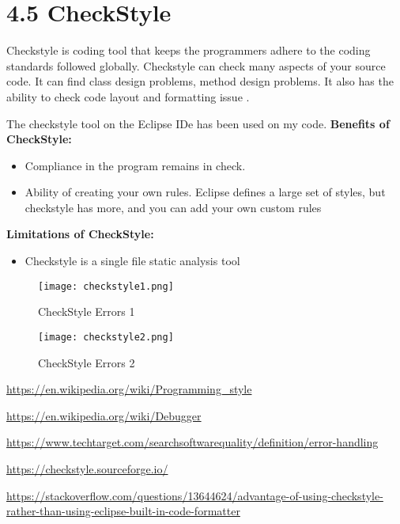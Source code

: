 \documentclass{report}
\begin{document}
\section*{4.5 CheckStyle}
Checkstyle is coding tool that keeps the programmers adhere to the coding standards followed globally. Checkstyle can check many aspects of your source code. It can find class design problems, method design problems. It also has the ability to check code layout and formatting issue \cite{check}.

The checkstyle tool on the Eclipse IDe has been used on my code.
\textbf{Benefits of CheckStyle:}
\begin{itemize}
    \item Compliance in the program remains in check.
    \item Ability of creating your own rules. Eclipse defines a large set of styles, but checkstyle has more, and you can add your own custom rules \cite{stackoverflow}
\end{itemize}
\textbf{Limitations of CheckStyle:}
\begin{itemize}
    \item Checkstyle is a single file static analysis tool\cite{check}
\end{itemize}

\begin{figure}[h!]
\centering
   \texttt{[image: checkstyle1.png]}
   \caption{CheckStyle Errors 1}
\end{figure}

\begin{figure}[h!]
\centering
   \texttt{[image: checkstyle2.png]}
   \caption{CheckStyle Errors 2}
\end{figure}

\begin{thebibliography}{9}
\url{https://en.wikipedia.org/wiki/Programming_style}

\url{https://en.wikipedia.org/wiki/Debugger}

\url{https://www.techtarget.com/searchsoftwarequality/definition/error-handling}

\url{https://checkstyle.sourceforge.io/}

\url{https://stackoverflow.com/questions/13644624/advantage-of-using-checkstyle-rather-than-using-eclipse-built-in-code-formatter}
\end{thebibliography}
\end{document}

